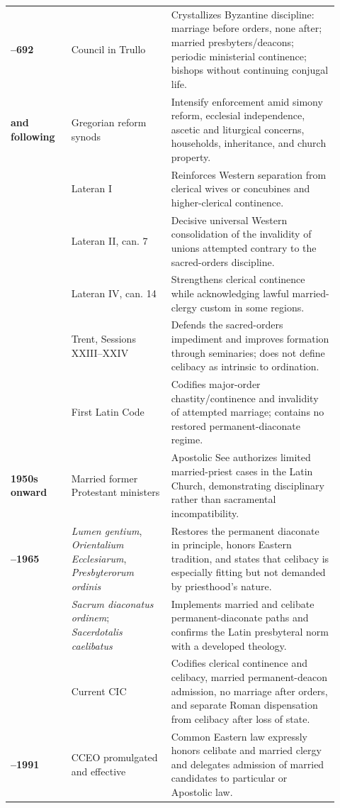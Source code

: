 \begin{longtable}{>{\bfseries\RaggedRight\arraybackslash}p{0.17\linewidth}>{\RaggedRight\arraybackslash}p{0.28\linewidth}>{\RaggedRight\arraybackslash}p{0.47\linewidth}}
691--692 & Council in Trullo & Crystallizes Byzantine discipline: marriage before orders, none after; married presbyters/deacons; periodic ministerial continence; bishops without continuing conjugal life.\\
1074 and following & Gregorian reform synods & Intensify enforcement amid simony reform, ecclesial independence, ascetic and liturgical concerns, households, inheritance, and church property.\\
1123 & Lateran I & Reinforces Western separation from clerical wives or concubines and higher-clerical continence.\\
1139 & Lateran II, can. 7 & Decisive universal Western consolidation of the invalidity of unions attempted contrary to the sacred-orders discipline.\\
1215 & Lateran IV, can. 14 & Strengthens clerical continence while acknowledging lawful married-clergy custom in some regions.\\
1563 & Trent, Sessions XXIII--XXIV & Defends the sacred-orders impediment and improves formation through seminaries; does not define celibacy as intrinsic to ordination.\\
1917 & First Latin Code & Codifies major-order chastity/continence and invalidity of attempted marriage; contains no restored permanent-diaconate regime.\\
1950s onward & Married former Protestant ministers & Apostolic See authorizes limited married-priest cases in the Latin Church, demonstrating disciplinary rather than sacramental incompatibility.\\
1964--1965 & \emph{Lumen gentium}, \emph{Orientalium Ecclesiarum}, \emph{Presbyterorum ordinis} & Restores the permanent diaconate in principle, honors Eastern tradition, and states that celibacy is especially fitting but not demanded by priesthood's nature.\\
1967 & \emph{Sacrum diaconatus ordinem}; \emph{Sacerdotalis caelibatus} & Implements married and celibate permanent-diaconate paths and confirms the Latin presbyteral norm with a developed theology.\\
1983 & Current CIC & Codifies clerical continence and celibacy, married permanent-deacon admission, no marriage after orders, and separate Roman dispensation from celibacy after loss of state.\\
1990--1991 & CCEO promulgated and effective & Common Eastern law expressly honors celibate and married clergy and delegates admission of married candidates to particular or Apostolic law.\\

\end{longtable}

